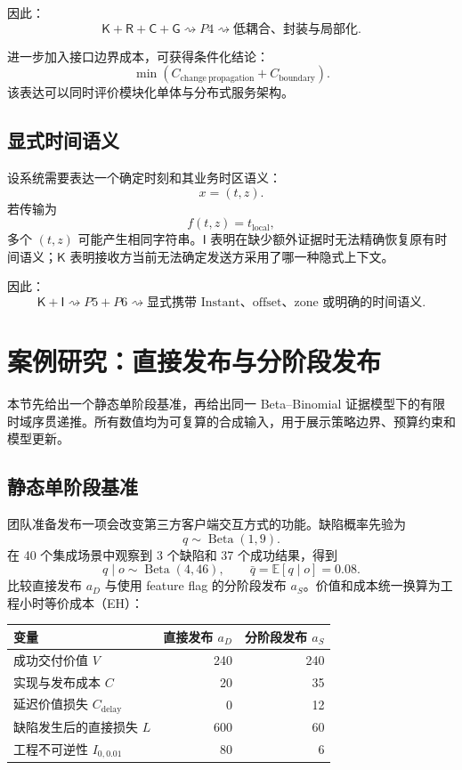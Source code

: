 \documentclass[11pt,a4paper]{ctexart}
\numberwithin{equation}{section}
\theoremstyle{definition}
\theoremstyle{plain}
\newcommand{\Know}{\mathsf{K}}
\newcommand{\Res}{\mathsf{R}}
\newcommand{\Ctrl}{\mathsf{C}}
\newcommand{\Info}{\mathsf{I}}
\newcommand{\Goal}{\mathsf{G}}
\begin{document}
因此：
\[
\Know+\Res+\Ctrl+\Goal
\rightsquigarrow
P4
\rightsquigarrow
\text{低耦合、封装与局部化}.
\]

进一步加入接口边界成本，可获得条件化结论：
\[
\min
\left(
C_{\mathrm{change\ propagation}}
+
C_{\mathrm{boundary}}
\right).
\]
该表达可以同时评价模块化单体与分布式服务架构。

\subsection{显式时间语义}

设系统需要表达一个确定时刻和其业务时区语义：
\[
x=(t,z).
\]
若传输为
\[
f(t,z)=t_{\mathrm{local}},
\]
多个 $(t,z)$ 可能产生相同字符串。$\Info$ 表明在缺少额外证据时无法精确恢复原有时间语义；$\Know$ 表明接收方当前无法确定发送方采用了哪一种隐式上下文。

因此：
\[
\Know+\Info
\rightsquigarrow
P5+P6
\rightsquigarrow
\text{显式携带 Instant、offset、zone 或明确的时间语义}.
\]

\section{案例研究：直接发布与分阶段发布}
\label{sec:case}

本节先给出一个静态单阶段基准，再给出同一 Beta--Binomial 证据模型下的有限时域序贯递推。所有数值均为可复算的合成输入，用于展示策略边界、预算约束和模型更新。

\subsection{静态单阶段基准}

团队准备发布一项会改变第三方客户端交互方式的功能。缺陷概率先验为
\[
q\sim\operatorname{Beta}(1,9).
\]
在 40 个集成场景中观察到 3 个缺陷和 37 个成功结果，得到
\[
q\mid o\sim\operatorname{Beta}(4,46),
\qquad
\bar q=\mathbb E[q\mid o]=0.08.
\]
比较直接发布 $a_D$ 与使用 feature flag 的分阶段发布 $a_S$。价值和成本统一换算为工程小时等价成本（EH）：

\begin{center}
\begin{tabular}{lrr}
\toprule
变量 & 直接发布 $a_D$ & 分阶段发布 $a_S$\\
\midrule
成功交付价值 $V$ & 240 & 240\\
实现与发布成本 $C$ & 20 & 35\\
延迟价值损失 $C_{\mathrm{delay}}$ & 0 & 12\\
缺陷发生后的直接损失 $L$ & 600 & 60\\
工程不可逆性 $I_{0,0.01}$ & 80 & 6\\
\bottomrule
\end{tabular}
\end{center}
\end{document}
